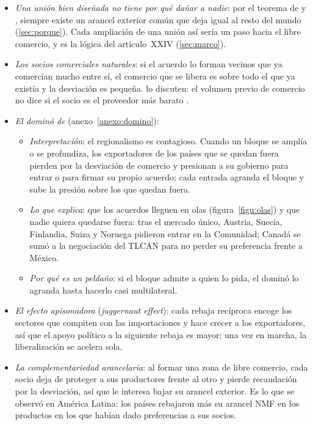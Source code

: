 \documentclass[11pt]{article}
\begin{document}
\begin{itemize}
\item \emph{Una unión bien diseñada no tiene por qué dañar a nadie}: por el teorema de  y , siempre existe un arancel exterior común que deja igual al resto del mundo (\ref{sec:porque}). Cada ampliación de una unión así sería un paso hacia el libre comercio, y es la lógica del artículo~XXIV (\ref{sec:marco}).
\item \emph{Los socios comerciales naturales}: si el acuerdo lo forman vecinos que ya comercian mucho entre sí, el comercio que se libera es sobre todo el que ya existía y la desviación es pequeña\nocite{Summers1991,Krugman1991Move}. \textcite{BhagwatiPanagariya1996} lo discuten: el volumen previo de comercio no dice si el socio es el proveedor más barato .
\item \emph{El dominó de } (anexo~\ref{anexo:domino}):
  \begin{itemize}
  \item \emph{Interpretación}: el regionalismo es contagioso. Cuando un bloque se amplía o se profundiza, los exportadores de los países que se quedan fuera pierden por la desviación de comercio y presionan a su gobierno para entrar o para firmar su propio acuerdo; cada entrada agranda el bloque y sube la presión sobre los que quedan fuera\nocite{Baldwin1993Domino,Baldwin1995Domino}.
  \item \emph{Lo que explica}: que los acuerdos lleguen en olas (figura~\ref{figu:olas}) y que nadie quiera quedarse fuera: tras el mercado único, Austria, Suecia, Finlandia, Suiza y Noruega pidieron entrar en la Comunidad; Canadá se sumó a la negociación del TLCAN para no perder su preferencia frente a México.
  \item \emph{Por qué es un peldaño}: si el bloque admite a quien lo pida, el dominó lo agranda hasta hacerlo casi multilateral.
  \end{itemize}
\item \emph{El efecto apisonadora} (\emph{juggernaut effect}): cada rebaja recíproca encoge los sectores que compiten con las importaciones y hace crecer a los exportadores, así que el apoyo político a la siguiente rebaja es mayor; una vez en marcha, la liberalización se acelera sola\nocite{BaldwinRobertNicoud2015}.
\item \emph{La complementariedad arancelaria}: al formar una zona de libre comercio, cada socio deja de proteger a sus productores frente al otro y pierde recaudación por la desviación, así que le interesa bajar su arancel exterior\nocite{Ornelas2005Rent}. Es lo que se observó en América Latina: los países rebajaron más su arancel NMF en los productos en los que habían dado preferencias a sus socios\nocite{EstevadeordalFreundOrnelas2008}.

\end{itemize}
\end{document}
